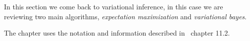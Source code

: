 
In this section we come back to variational inference, in this case we are  reviewing two main algorithms, \emph{expectation maximization} and \emph{variational bayes}. 

The chapter uses the notation and information described in~\cite{barber} chapter 11.2.